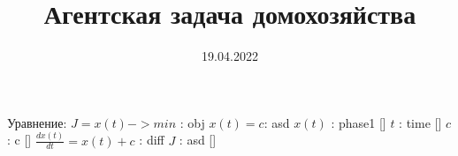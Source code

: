 \documentclass{a_model}
\title{Агентская задача домохозяйства}
\date{19.04.2022}
\begin{document}
Уравнение:
    $ J = x(t) -> min$ : obj
    $x(t) = c $: asd
    $x(t)$ : phase1 []
    $t$ : time []
    $c$ : c []
    $\frac{dx(t)}{dt} = x(t) + c$ : diff
    $J$ : asd []
\end{document}
